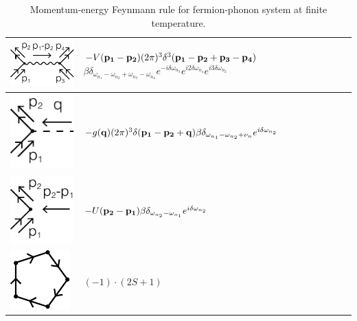 \documentclass[12pt]{book}
\begin{document}
\begin{table}[htp!]
\begin{tabular}{| >{\centering\arraybackslash}m{15em}|>{\centering\arraybackslash} m{24em}|}
		\hline
		\vspace{2.5ex}\includegraphics[scale=1]{resources/chap_feyn_diag/fdiag_frulep3.pdf}\vspace{1ex}&$-V({\bf p_1}-{\bf p_2})(2\pi)^3\delta^3({\bf p_1}-{\bf p_2}+{\bf p_3}-{\bf p_4})$\newline$\beta\delta_{\omega_{n_1}-\omega_{n_2}+\omega_{n_3}-\omega_{n_4}}e^{-i\delta \omega_{n_3}}e^{i2\delta \omega_{n_4}}e^{i3\delta \omega_{n_2}}$\vspace{0.5ex}\\
		\hline
		\vspace{2.5ex}\includegraphics[scale=1]{resources/chap_feyn_diag/fdiag_frulep4.pdf}\vspace{1ex}&$-g({\bf q})(2\pi)^3\delta({\bf p_1}-{\bf p_2}+{\bf q})\beta\delta_{\omega_{n_1}-\omega_{n_2}+\nu_n}e^{i\delta \omega_{n_2}}$\vspace{0.5ex}\\
		\hline
		\vspace{2.5ex}\includegraphics[scale=1]{resources/chap_feyn_diag/fdiag_frulep5.pdf}\vspace{1ex}&$-U({\bf p_2}-{\bf p_1})\beta\delta_{\omega_{n_2}-\omega_{n_1}}e^{i\delta \omega_{n_2}}$\vspace{0.5ex}\\
		\hline
		\vspace{2.5ex}\includegraphics[scale=1]{resources/chap_feyn_diag/fdiag_frule6.pdf}\vspace{1ex}&$(-1)\cdot(2S+1)$\vspace{0.5ex}\\
		\hline
		\end{tabular}
		\caption{Momentum-energy Feynmann rule for fermion-phonon system at finite temperature.}
		\label{tab:momentum_frule_fT}
	\end{table}
\end{document}
